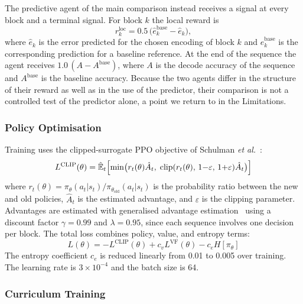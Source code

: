 \documentclass[entropy,article,submit,moreauthors]{Definitions/mdpi}
\begin{document}
The predictive agent of the main comparison instead receives a signal at every block and a terminal signal. For block $k$ the local reward is
\begin{equation}
    r_k^{\text{loc}} = 0.5\,\bigl(\hat{e}^{\text{base}}_k - \hat{e}_k\bigr),
    \label{eq:local}
\end{equation}
where $\hat{e}_k$ is the error predicted for the chosen encoding of block $k$ and $\hat{e}^{\text{base}}_k$ is the corresponding prediction for a baseline reference. At the end of the sequence the agent receives $1.0\,(A - A^{\text{base}})$, where $A$ is the decode accuracy of the sequence and $A^{\text{base}}$ is the baseline accuracy. Because the two agents differ in the structure of their reward as well as in the use of the predictor, their comparison is not a controlled test of the predictor alone, a point we return to in the Limitations.

\subsubsection{Policy Optimisation}

Training uses the clipped-surrogate PPO objective of Schulman \textit{et al.}~\cite{schulman2017}:
\begin{equation}
    L^{\text{CLIP}}(\theta) = \hat{\mathbb{E}}_t \Bigl[
    \min\bigl(r_t(\theta)\hat{A}_t,\;
    \text{clip}(r_t(\theta),\, 1{-}\varepsilon,\, 1{+}\varepsilon)
    \hat{A}_t\bigr)\Bigr]
    \label{eq:ppo}
\end{equation}
where $r_t(\theta) = \pi_\theta(a_t | s_t) / \pi_{\theta_{\text{old}}}(a_t | s_t)$ is the probability ratio between the new and old policies, $\hat{A}_t$ is the estimated advantage, and $\varepsilon$ is the clipping parameter. Advantages are estimated with generalised advantage estimation~\cite{schulman2016gae} using a discount factor $\gamma = 0.99$ and $\lambda = 0.95$, since each sequence involves one decision per block. The total loss combines policy, value, and entropy terms:
\begin{equation}
    L(\theta) = -L^{\text{CLIP}}(\theta) + c_v L^{\text{VF}}(\theta) - c_e H[\pi_\theta]
    \label{eq:total_loss}
\end{equation}
The entropy coefficient $c_e$ is reduced linearly from 0.01 to 0.005 over training. The learning rate is $3 \times 10^{-4}$ and the batch size is 64.

\subsubsection{Curriculum Training}\label{sec:curriculum}
\end{document}
